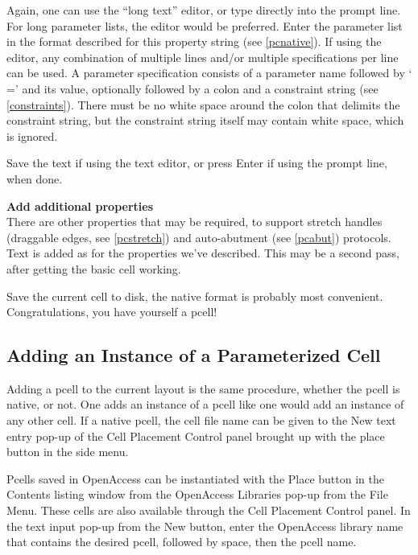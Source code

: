 \begin{description}
Again, one can use the ``long text'' editor, or type directly into the
prompt line.  For long parameter lists, the editor would be preferred. 
Enter the parameter list in the format described for this property
string (see \ref{pcnative}).  If using the editor, any combination of
multiple lines and/or multiple specifications per line can be used.  A
parameter specification consists of a parameter name followed by `{\vt
=}' and its value, optionally followed by a colon and a constraint
string (see \ref{constraints}).  There must be no white space around
the colon that delimits the constraint string, but the constraint
string itself may contain white space, which is ignored.

Save the text if using the text editor, or press {\kb Enter} if using
the prompt line, when done.

\item{\bf Add additional properties}\\
There are other properties that may be required, to support stretch
handles (draggable edges, see \ref{pcstretch}) and auto-abutment (see
\ref{pcabut}) protocols.  Text is added as for the properties we've
described.  This may be a second pass, after getting the basic cell
working.
\end{description}

Save the current cell to disk, the native format is probably
most convenient.  Congratulations, you have yourself a pcell!

\subsection{Adding an Instance of a Parameterized Cell}

Adding a pcell to the current layout is the same procedure, whether
the pcell is native, or not.  One adds an instance of a pcell like one
would add an instance of any other cell.  If a native pcell, the cell
file name can be given to the {\cb New} text entry pop-up of the {\cb
Cell Placement Control} panel brought up with the {\cb place} button
in the side menu.

Pcells saved in OpenAccess can be instantiated with the {\cb Place}
button in the {\cb Contents} listing window from the {\cb OpenAccess
Libraries} pop-up from the {\cb File Menu}.  These cells are also
available through the {\cb Cell Placement Control} panel.  In the text
input pop-up from the {\cb New} button, enter the OpenAccess library
name that contains the desired pcell, followed by space, then the
pcell name.

